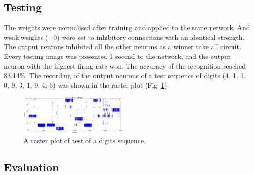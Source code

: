 \subsection{Testing}
The weights were normalised after training and applied to the same network.
And weak weights (=0) were set to inhibitory connections with an identical strength.
The output neurons inhibited all the other neurons as a winner take all circuit.
Every testing image was presented 1 second to the network, and the output neuron with the highest firing rate won.
The accuracy of the recognition reached 83.14\%.
The recording of the output neurons of a test sequence of digits (4, 1, 1, 0, 9, 3, 1, 9, 4, 6) was shown in the raster plot (Fig~\ref{Fig:output}).
\begin{figure}[hbt!]
	\centering
	\includegraphics[width=0.48\textwidth]{images/test300-301.png}
	\caption{A raster plot of test of a digits sequence.}
	\label{Fig:output}
\end{figure} 
\subsection{Evaluation}

	